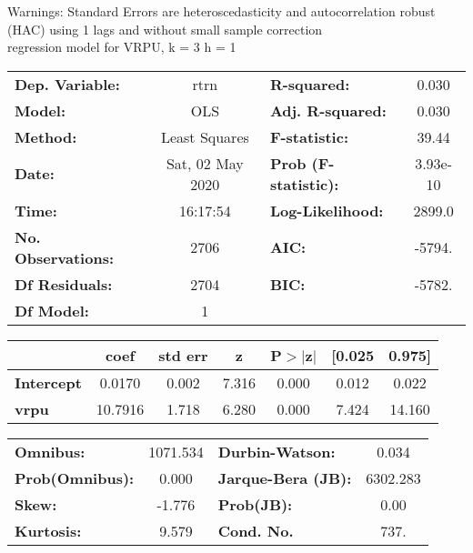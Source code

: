 Warnings: \newline
 [1] Standard Errors are heteroscedasticity and autocorrelation robust (HAC) using 1 lags and without small sample correction\\ 

regression model for VRPU, k = 3 h = 1\begin{center}
\begin{tabular}{lclc}
\toprule
\textbf{Dep. Variable:}    &       rtrn       & \textbf{  R-squared:         } &     0.030   \\
\textbf{Model:}            &       OLS        & \textbf{  Adj. R-squared:    } &     0.030   \\
\textbf{Method:}           &  Least Squares   & \textbf{  F-statistic:       } &     39.44   \\
\textbf{Date:}             & Sat, 02 May 2020 & \textbf{  Prob (F-statistic):} &  3.93e-10   \\
\textbf{Time:}             &     16:17:54     & \textbf{  Log-Likelihood:    } &    2899.0   \\
\textbf{No. Observations:} &        2706      & \textbf{  AIC:               } &    -5794.   \\
\textbf{Df Residuals:}     &        2704      & \textbf{  BIC:               } &    -5782.   \\
\textbf{Df Model:}         &           1      & \textbf{                     } &             \\
\bottomrule
\end{tabular}
\begin{tabular}{lcccccc}
                   & \textbf{coef} & \textbf{std err} & \textbf{z} & \textbf{P$> |$z$|$} & \textbf{[0.025} & \textbf{0.975]}  \\
\midrule
\textbf{Intercept} &       0.0170  &        0.002     &     7.316  &         0.000        &        0.012    &        0.022     \\
\textbf{vrpu}      &      10.7916  &        1.718     &     6.280  &         0.000        &        7.424    &       14.160     \\
\bottomrule
\end{tabular}
\begin{tabular}{lclc}
\textbf{Omnibus:}       & 1071.534 & \textbf{  Durbin-Watson:     } &    0.034  \\
\textbf{Prob(Omnibus):} &   0.000  & \textbf{  Jarque-Bera (JB):  } & 6302.283  \\
\textbf{Skew:}          &  -1.776  & \textbf{  Prob(JB):          } &     0.00  \\
\textbf{Kurtosis:}      &   9.579  & \textbf{  Cond. No.          } &     737.  \\
\bottomrule
\end{tabular}
\end{center}

